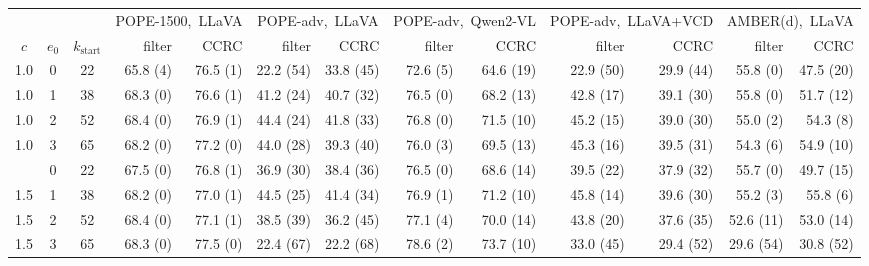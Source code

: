 \begin{tabular}{cccrrrrrrrrrr}
\toprule
 & & & \multicolumn{2}{c}{POPE-1500,~LLaVA} & \multicolumn{2}{c}{POPE-adv,~LLaVA} & \multicolumn{2}{c}{POPE-adv,~Qwen2-VL} & \multicolumn{2}{c}{POPE-adv,~LLaVA+VCD} & \multicolumn{2}{c}{AMBER(d),~LLaVA}\\
\cmidrule(lr){4-5}\cmidrule(lr){6-7}\cmidrule(lr){8-9}\cmidrule(lr){10-11}\cmidrule(lr){12-13}
$c$ & $e_0$ & $k_{\mathrm{start}}$ & filter & CCRC & filter & CCRC & filter & CCRC & filter & CCRC & filter & CCRC\\
\midrule
1.0 & 0 & 22 & 65.8 (4) & 76.5 (1) & 22.2 (54) & 33.8 (45) & 72.6 (5) & 64.6 (19) & 22.9 (50) & 29.9 (44) & 55.8 (0) & 47.5 (20)\\
1.0 & 1 & 38 & 68.3 (0) & 76.6 (1) & 41.2 (24) & 40.7 (32) & 76.5 (0) & 68.2 (13) & 42.8 (17) & 39.1 (30) & 55.8 (0) & 51.7 (12)\\
1.0 & 2 & 52 & 68.4 (0) & 76.9 (1) & 44.4 (24) & 41.8 (33) & 76.8 (0) & 71.5 (10) & 45.2 (15) & 39.0 (30) & 55.0 (2) & 54.3 (8)\\
1.0 & 3 & 65 & 68.2 (0) & 77.2 (0) & 44.0 (28) & 39.3 (40) & 76.0 (3) & 69.5 (13) & 45.3 (16) & 39.5 (31) & 54.3 (6) & 54.9 (10)\\
\addlinespace
1.5 & 0 & 22 & 67.5 (0) & 76.8 (1) & 36.9 (30) & 38.4 (36) & 76.5 (0) & 68.6 (14) & 39.5 (22) & 37.9 (32) & 55.7 (0) & 49.7 (15)\\
1.5 & 1 & 38 & 68.2 (0) & 77.0 (1) & 44.5 (25) & 41.4 (34) & 76.9 (1) & 71.2 (10) & 45.8 (14) & 39.6 (30) & 55.2 (3) & 55.8 (6)\\
1.5 & 2 & 52 & 68.4 (0) & 77.1 (1) & 38.5 (39) & 36.2 (45) & 77.1 (4) & 70.0 (14) & 43.8 (20) & 37.6 (35) & 52.6 (11) & 53.0 (14)\\
1.5 & 3 & 65 & 68.3 (0) & 77.5 (0) & 22.4 (67) & 22.2 (68) & 78.6 (2) & 73.7 (10) & 33.0 (45) & 29.4 (52) & 29.6 (54) & 30.8 (52)\\
\bottomrule
\end{tabular}
